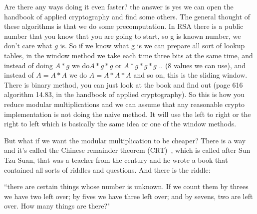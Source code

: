 Are there any ways doing it even faster? the answer is yes we can open the handbook of applied cryptography and find some others.
The general thought of these algorithms is that we do some precomputation. In RSA there is a public number that you know that you are going to start, so g is known number, we don't care what $g$ is. So if we know what g is we can prepare all sort of lookup tables, in the window method we take each time three bits at the same time, and instead of doing \(A*g\) we do\( A*g*g\) or \(A*g*g*g\) .. (8 values we can use), and instead of \( A=A*A\) we do \(A=A*A*A\) and so on, this is the sliding window. There is binary method, you can just look at the book and find out (page 616 algorithm 14.83, in the handbook of applied cryptography). So this is how you reduce modular multiplications and we can assume that any reasonable crypto implementation is not doing the naive method. It will use the left to right or the right to left which is basically the same idea or one of the window methods.

But what if we want the modular multiplication to be cheaper? There is a way and it's called the Chinese remainder theorem (CRT)~\cite{dingyi1996chinese}, which is called after Sun Tzu Suan, that was a teacher from the  century and he wrote a book that contained all sorts of riddles and questions. And there is the riddle: 

``there are certain things whose number is unknown.  If we count them by threes we have two left over; by fives we have three left over; and by sevens, two are left over. How many things are there?" 

